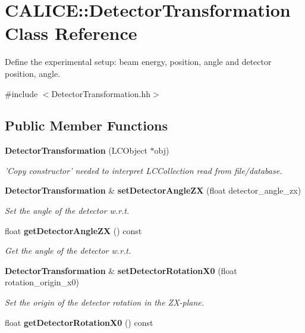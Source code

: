 \section{CALICE::DetectorTransformation Class Reference}
\label{classCALICE_1_1DetectorTransformation}


Define the experimental setup: beam energy, position, angle and detector position, angle.  


{\ttfamily \#include $<$DetectorTransformation.hh$>$}\subsection*{Public Member Functions}
\begin{DoxyCompactItemize}
\item 
{\bf DetectorTransformation} (LCObject $\ast$obj)\label{classCALICE_1_1DetectorTransformation_aa0cecf48097264a6a6cc0af071008d0b}

\begin{DoxyCompactList}\small\item\em 'Copy constructor' needed to interpret LCCollection read from file/database. \item\end{DoxyCompactList}\item 
{\bf DetectorTransformation} \& {\bf setDetectorAngleZX} (float detector\_\-angle\_\-zx)
\begin{DoxyCompactList}\small\item\em Set the angle of the detector w.r.t. \item\end{DoxyCompactList}\item 
float {\bf getDetectorAngleZX} () const 
\begin{DoxyCompactList}\small\item\em Get the angle of the detector w.r.t. \item\end{DoxyCompactList}\item 
{\bf DetectorTransformation} \& {\bf setDetectorRotationX0} (float rotation\_\-origin\_\-x0)\label{classCALICE_1_1DetectorTransformation_a2eef8fc060f0844f2c58dd406e236dcf}

\begin{DoxyCompactList}\small\item\em Set the origin of the detector rotation in the ZX-\/plane. \item\end{DoxyCompactList}\item 
float {\bf getDetectorRotationX0} () const \label{classCALICE_1_1DetectorTransformation_afcbf82cfdf8f7e59f8eb9d0dbbcacaf2}


\end{DoxyCompactItemize}
